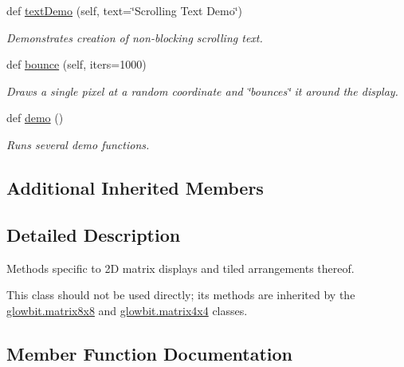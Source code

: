 \begin{DoxyCompactItemize}
def \hyperlink{classglowbit_1_1glowbitMatrix_a6232220b12c86c7ec361cde374419ac4}{text\+Demo} (self, text=\char`\"{}Scrolling Text Demo\char`\"{})
\begin{DoxyCompactList}\small\item\em Demonstrates creation of non-\/blocking scrolling text. \end{DoxyCompactList}\item 
\mbox{\label{classglowbit_1_1glowbitMatrix_a969352871a02db3d55bcabe5b5107574}} 
def \hyperlink{classglowbit_1_1glowbitMatrix_a969352871a02db3d55bcabe5b5107574}{bounce} (self, iters=1000)
\begin{DoxyCompactList}\small\item\em Draws a single pixel at a random coordinate and \char`\"{}bounces\char`\"{} it around the display. \end{DoxyCompactList}\item 
\mbox{\label{classglowbit_1_1glowbitMatrix_a85ca62b9282bda87b15d275df61ead16}} 
def \hyperlink{classglowbit_1_1glowbitMatrix_a85ca62b9282bda87b15d275df61ead16}{demo} ()
\begin{DoxyCompactList}\small\item\em Runs several demo functions. \end{DoxyCompactList}\end{DoxyCompactItemize}
\subsection*{Additional Inherited Members}


\subsection{Detailed Description}
Methods specific to 2D matrix displays and tiled arrangements thereof. 

This class should not be used directly; its methods are inherited by the \hyperlink{classglowbit_1_1matrix8x8}{glowbit.\+matrix8x8} and \hyperlink{classglowbit_1_1matrix4x4}{glowbit.\+matrix4x4} classes. 

\subsection{Member Function Documentation}
\mbox{\label{classglowbit_1_1glowbitMatrix_adf29bdb4294bcf27ae560130b0fcae35}} 
